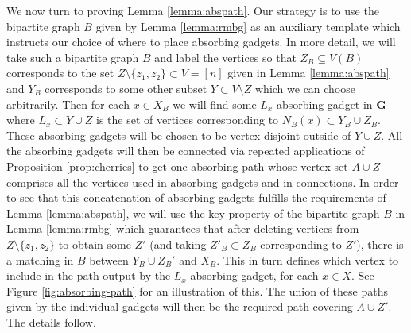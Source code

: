 \documentclass[11pt, dvipsnames]{amsart}
\theoremstyle{plain}
\theoremstyle{definition}
\begin{document}
We now turn to proving Lemma \ref{lemma:abspath}. Our strategy is to use the bipartite graph $B$ given by  Lemma \ref{lemma:rmbg} as an auxiliary template which instructs our choice of where to place absorbing gadgets. In more detail, we will take such a bipartite graph $B$ and label the vertices so that   $Z_B\subseteq V(B)$ corresponds to the set $Z\setminus \{z_1,z_2\}\subset V=[n]$ given in Lemma \ref{lemma:abspath} and $Y_B$ corresponds to some other subset $Y\subset V\setminus Z$ which we can choose arbitrarily. Then for each $x\in X_B$ we will find some $L_x$-absorbing gadget in $\mathbf{G}$ where $L_x\subset Y\cup Z$ is the set of vertices corresponding to $N_B(x)\subset Y_B\cup Z_B$. These absorbing gadgets will be chosen to be vertex-disjoint outside of $Y\cup Z$. All the absorbing gadgets will then be connected via repeated applications of Proposition \ref{prop:cherries} to get one absorbing path whose vertex set $A\cup Z$ comprises all the vertices used in absorbing gadgets and in connections. In order to see that this concatenation of absorbing gadgets fulfills the requirements of Lemma \ref{lemma:abspath}, we will use the key property of the bipartite graph $B$ in Lemma \ref{lemma:rmbg} which guarantees that after deleting vertices from $Z\setminus \{z_1,z_2\}$ to obtain some $Z'$ (and taking $Z'_B\subset Z_B$ corresponding to $Z'$), there is a matching in $B$ between $Y_B\cup Z_B'$ and $X_B$. This in turn defines which vertex to include in the path output by the $L_x$-absorbing gadget, for each $x\in X$.  See Figure \ref{fig:absorbing-path} for an illustration of this. The union of these paths given by the individual gadgets will then be the required path covering $A\cup Z'$. The details follow.
\end{document}
